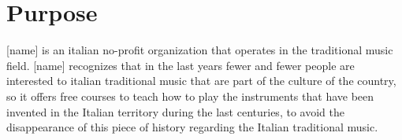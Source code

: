 \documentclass[../../DD.tex]{subfiles}
\begin{document}
\section{Purpose}
[name] is an italian no-profit organization that operates in the traditional music field. [name] recognizes that in the last years fewer and fewer people are interested to italian traditional music that are part of the culture of the country, so it offers free courses to teach how to play the instruments that have been invented in the Italian territory during the last centuries, to avoid the disappearance of this piece of history regarding the Italian traditional music. 
\end{document}
